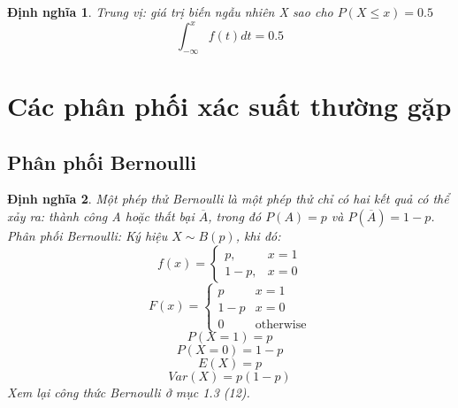 \documentclass[12pt]{article}
\def\bar#1{\overline{#1}}
\newtheorem{thm}{Định nghĩa}
\begin{document}
\begin{thm}
    Trung vị: giá trị biến ngẫu nhiên X sao cho $P(X \leq x) = 0.5$
    \begin{equation}
    \int_{-\infty}^x f(t)dt = 0.5
    \end{equation}
\end{thm}

\section{Các phân phối xác suất thường gặp}
\subsection{Phân phối Bernoulli}
\begin{thm}
    Một phép thử Bernoulli là một phép thử chỉ có hai kết quả có thể xảy ra: thành công A hoặc thất bại $\bar{A}$, trong đó $P(A) = p$ và $P(\bar{A}) = 1 - p$.
    Phân phối Bernoulli: Ký hiệu $X \sim B(p)$, khi đó:
    \begin{equation}
    f(x) = \begin{cases}
    p, & x = 1 \\
    1 - p, & x = 0
    \end{cases}
    \end{equation}
    \begin{equation}
    F(x) = \begin{cases}
        p & x = 1 \\
        1 - p & x = 0 \\
        0 & \text{otherwise}
    \end{cases}
    \end{equation}
    \begin{equation}
    P(X = 1) = p
    \end{equation}
    \begin {equation}
    P(X = 0) = 1 - p
    \end{equation}
    \begin{equation}
    E(X) = p
    \end{equation}
    \begin{equation}
    Var(X) = p(1 - p)
    \end{equation}
    Xem lại công thức Bernoulli ở mục 1.3 (12).
\end{thm}
\end{document}
